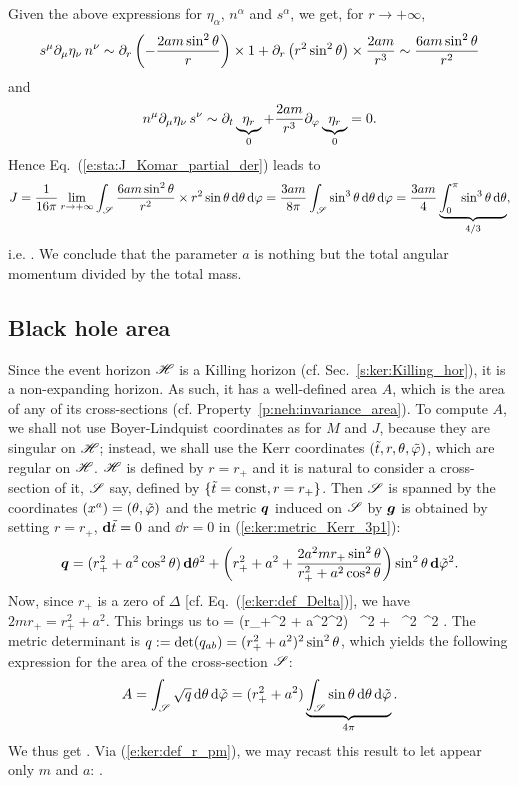 Given the above expressions for $\eta_\alpha$, $n^\alpha$ and $s^\alpha$,
we get, for $r\rightarrow+\infty$,
\[
  s^\mu \partial_\mu \eta_\nu \, n^\nu \sim \partial_r \left( - \frac{2 a m \sin^2\theta}{r} \right) \times 1 + \partial_r \left(r^2 \sin^2\theta \right) \times \frac{2 a m}{r^3}
    \sim \frac{6 a m \sin^2\theta}{r^2}
\]
and
\[
    n^\mu \partial_\mu \eta_\nu \, s^\nu \sim \partial_t \underbrace{\eta_r}_{0}
        + \frac{2 a m}{r^3} \partial_\varphi \underbrace{\eta_r}_{0}  = 0 .
\]
Hence Eq.~(\ref{e:sta:J_Komar_partial_der}) leads to
\[
    J = \frac{1}{16\pi} \lim_{r\rightarrow +\infty}
        \int_{\mathscr{S}}
        \frac{6 a m \sin^2\theta}{r^2} \times
        r^2\sin\theta \, \mathrm{d}\theta\, \mathrm{d}\varphi  =
        \frac{3 a m}{8\pi} \int_{\mathscr{S}} \sin^3\theta \, \mathrm{d}\theta\, \mathrm{d}\varphi
        = \frac{3 a m}{4} \underbrace{\int_0^\pi \sin^3\theta \, \mathrm{d}\theta}_{4/3} ,
\]
i.e.
\be \label{e:ker:J_am}
     .
\ee
We conclude that the parameter $a$ is nothing but the total angular momentum
divided by the total mass.

\subsection{Black hole area}

Since the event horizon $\mathscr{H}$ is a Killing horizon (cf. Sec.~\ref{s:ker:Killing_hor}),
it is a non-expanding horizon. As such, it has a well-defined
area $A$, which is the
area of any of its cross-sections (cf. Property~\ref{p:neh:invariance_area}).
To compute $A$, we shall not use Boyer-Lindquist
coordinates as for $M$ and $J$, because they are singular on $\mathscr{H}$; instead, we shall
use the Kerr coordinates $({\tilde t}, r, \theta,{\tilde\varphi})$, which are regular
on $\mathscr{H}$. $\mathscr{H}$ is defined by $r=r_+$ and it is natural to consider a
cross-section of it, $\mathscr{S}$ say, defined by $\{{\tilde t}=\mathrm{const}, r=r_+\}$.
Then $\mathscr{S}$ is spanned by the coordinates $(x^a) = (\theta,{\tilde\varphi})$ and the metric $\bm{q}$
induced on $\mathscr{S}$ by $\bm{g}$ is obtained by setting $r=r_+$,
$\mathbf{d}{\tilde t}=0$ and $\dd r = 0$ in (\ref{e:ker:metric_Kerr_3p1}):
\[
        \bm{q} =
   (r_+^2 + a^2\cos^2\theta)\, \mathbf{d} \theta^2
    + \left( r_+^2 + a^2 + \frac{2 a^2 m r_+ \sin^2\theta}{r_+^2 + a^2\cos^2\theta} \right)
    \sin^2\theta \, \mathbf{d} {\tilde\varphi}^2 .
\]
Now, since $r_+$ is a zero of $\Delta$ [cf. Eq.~(\ref{e:ker:def_Delta})],
we have $2 m r_+ = r_+^2 + a^2 $. This brings us to
\be \label{e:ker:q_cross_section_H}
         =
  (r_+^2 + a^2\cos^2\th) \, \dd \th^2
    + \,
    \sin^2\th \, \dd \tph^2 .
\ee
The metric determinant is $q := \det (q_{ab}) = (r_+^2 + a^2)^2 \sin^2\theta$, which yields
the following expression for the area of the cross-section $\mathscr{S}$:
\[
    A = \int_{\mathscr{S}} \sqrt{q} \, \mathrm{d}\theta\, \mathrm{d}{\tilde\varphi}
      = (r_+^2 + a^2) \underbrace{\int_{\mathscr{S}} \sin\theta \, \mathrm{d}\theta\, \mathrm{d}{\tilde\varphi}}_{4\pi} .
\]
We thus get
\be \label{e:ker:A_rp_a_m}
     .
\ee
Via (\ref{e:ker:def_r_pm}),
we may recast this result to let appear only $m$ and $a$:
\be \label{e:ker:A_a_m}
     .
\ee

